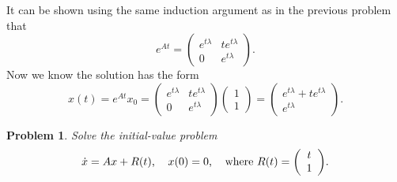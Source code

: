 \documentclass{article}
\newtheorem{problem}{Problem}
\begin{document}
It can be shown using the same induction argument as in the previous problem that
\[
e^{At} =
\left (
\begin{array}{cc}
e^{t \lambda} & t e^{t \lambda}\\
0 & e^{t \lambda}
\end{array}
\right ).
\]
Now we know the solution has the form
\[
x(t) = e^{At} x_0 =
\left (
\begin{array}{cc}
e^{t \lambda} & t e^{t \lambda}\\
0 & e^{t \lambda}
\end{array}
\right ) \left (
\begin{array}{c}
1\\
1
\end{array}
\right ) = \left (
\begin{array}{cc}
e^{t \lambda} + t e^{t \lambda}\\
e^{t \lambda}
\end{array}
\right ).
\]

\begin{problem}
Solve the initial-value problem
\[
\begin{tabular}{ccc}
$\displaystyle{\dot{x} = Ax + R(t)}$, & $\displaystyle{x(0) = 0}$, & where $\displaystyle{R(t) = \left ( \begin{array}{c} t\\ 1 \end{array} \right )}$.
\end{tabular}
\]
\end{problem}
\end{document}
